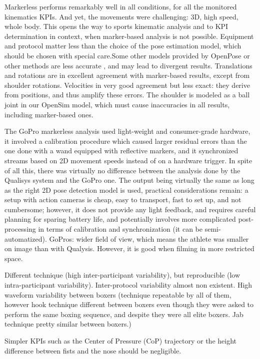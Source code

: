 Markerless performs remarkably well in all conditions, for all the monitored kinematics KPIs.
And yet, the movements were challenging: 3D, high speed, whole body. This opens the way to sports kinematic analysis and to KPI determination in context, when marker-based analysis is not possible. 
Equipment and protocol matter less than the choice of the pose estimation model, which should be chosen with special care.Some other models provided by OpenPose or other methods are less accurate \cite{Needham2021b}, and may lead to divergent results. 
Translations and rotations are in excellent agreement with marker-based results, except from shoulder rotations. Velocities in very good agreement but less exact: they derive from positions, and thus amplify these errors. The shoulder is modeled as a ball joint in our OpenSim model, which must cause inaccuracies in all results, including marker-based ones.

The GoPro markerless analysis used light-weight and consumer-grade hardware, it involved a calibration procedure which caused larger residual errors than the one done with a wand equipped with reflective markers, and it synchronized streams based on 2D movement speeds instead of on a hardware trigger. In spite of all this, there was virtually no difference between the analysis done by the Qualisys system and the GoPro one. The output being virtually the same as long as the right 2D pose detection model is used, practical considerations remain: a setup with action cameras is cheap, easy to transport, fast to set up, and not cumbersome; however, it does not provide any light feedback, and requires careful planning for sparing battery life, and potentially involves more complicated post-processing in terms of calibration and synchronization (it can be semi-automatized).
GoPros: wider field of view, which means the athlete was smaller on image than with Qualysis. However, it is good when filming in more restricted space.


Different technique (high inter-participant variability), but reproducible (low intra-participant variability). Inter-protocol variability almost non existent. High waveform variability between boxers (technique repeatable by all of them, however hook technique different between boxers even though they were asked to perform the same boxing sequence, and despite they were all elite boxers. Jab technique pretty similar between boxers.)

Simpler KPIs such as the Center of Pressure (CoP) trajectory or the height difference between fists and the nose should be negligible.

